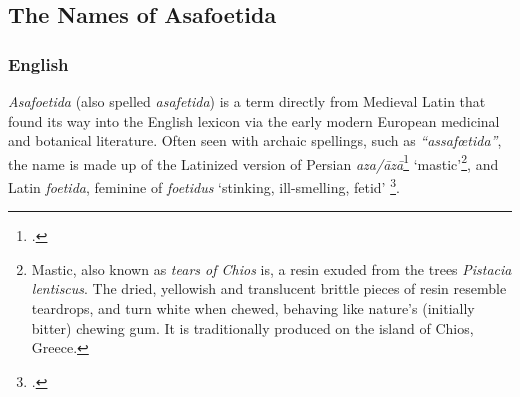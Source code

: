 \subsection{The Names of Asafoetida}

\subsubsection{English}



\textit{Asafoetida} (also spelled \textit{asafetida}) is a term directly from Medieval Latin that found its way into the English lexicon via the early modern European medicinal and botanical literature. Often seen with archaic spellings, such as \textit{``assafœtida''}, the name is made up of the Latinized version of Persian  \textit{aza/āzā}\footcite[][p. 42, \url{https://dsal.uchicago.edu/cgi-bin/app/steingass_query.py?page=42}]{steingass_comprehensive_1892} `mastic'\footnote{Mastic, also known as \textit{tears of Chios} is, a resin exuded from the trees \textit{Pistacia lentiscus}. The dried, yellowish and translucent brittle pieces of resin resemble teardrops, and turn white when chewed, behaving like nature's (initially bitter) chewing gum. It is traditionally produced on the island of Chios, Greece.}, and Latin \textit{foetida}, feminine of \textit{foetidus} `stinking, ill-smelling, fetid' \footcite[asafoetida]{oed}. 

% 

